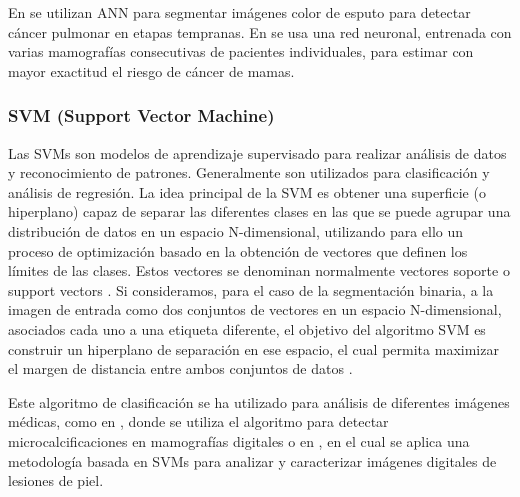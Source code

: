 En \citep{taher2011lung} se utilizan ANN para segmentar imágenes color de esputo para detectar cáncer pulmonar en etapas tempranas. En \citep{ayer2010breast} se usa una red neuronal, entrenada con varias mamografías consecutivas de pacientes individuales, para estimar con mayor exactitud el riesgo de cáncer de mamas.

\subsubsection{SVM (Support Vector Machine)}
Las SVMs son modelos de aprendizaje supervisado para realizar análisis de datos y reconocimiento de patrones. Generalmente son utilizados para clasificación y análisis de regresión. La idea principal de la SVM es obtener una superficie (o hiperplano) capaz de separar las diferentes clases en las que se puede agrupar una distribución de datos en un espacio N-dimensional, utilizando para ello un proceso de optimización basado en la obtención de vectores que definen los límites de las clases. Estos vectores se denominan normalmente vectores soporte o support vectors \citep{cortes1995support}. Si consideramos, para el caso de la segmentación binaria, a la imagen de entrada como dos conjuntos de vectores en un espacio N-dimensional, asociados cada uno a una etiqueta diferente, el objetivo del algoritmo SVM es construir un hiperplano de separación en ese espacio, el cual permita maximizar el margen de distancia entre ambos conjuntos de datos \citep{scholkopf1999advances}.

Este algoritmo de clasificación  se ha utilizado para análisis de diferentes imágenes médicas, como en \citep{el2002support}, donde se utiliza el algoritmo para detectar  microcalcificaciones en mamografías digitales o en \citep{maglogiannis2004characterization}, en el cual se aplica una metodología basada en SVMs para analizar y caracterizar imágenes digitales de lesiones de piel.
